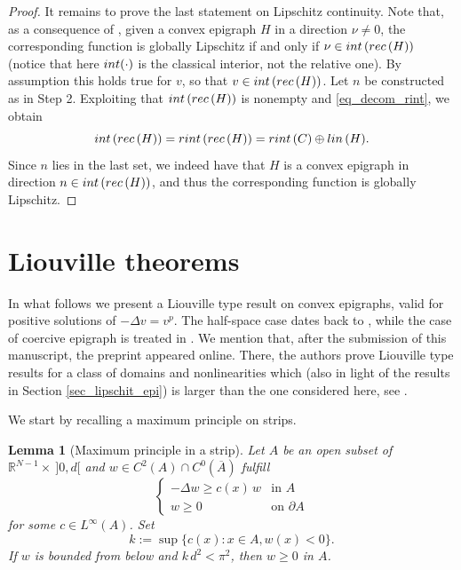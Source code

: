 \documentclass[12pt]{amsart}
\numberwithin{equation}{section}
\theoremstyle{plain}
\newtheorem{lemma}[theorem]{Lemma}
\theoremstyle{plain}
\theoremstyle{plain}
\theoremstyle{definition}
\newcommand{\R}{{\mathbb R}}
\renewcommand{\ge}{\geqslant}
\begin{document}
\begin{proof}
It remains to prove the last statement on Lipschitz continuity. 
Note that, as a consequence of \cite[Theorems 8.5 and 10.5]{Roc96}, given a convex epigraph $H$ in a direction $\nu\ne 0$, the corresponding function is globally Lipschitz if and only if $\nu\in {\rm int}\, ({\rm rec}\, (H))$ (notice that here ${\rm int}(\cdot)$ is the classical interior, not the relative one). 
By assumption this holds true for $v$, so that $v\in {\rm int}\, ({\rm rec}\, (H))$. Let $n$ be constructed as in Step 2. 
Exploiting that ${\rm int}\, ({\rm rec}\, (H))$ is nonempty and \eqref{eq_decom_rint}, we obtain 
 \[
 {\rm int}\, ({\rm rec}\, (H))={\rm rint}\, ({\rm rec}\, (H))={\rm rint}\, (C)\oplus {\rm lin}\, (H).
 \]
Since $n$ lies in the last set, we indeed have that $H$ is a convex epigraph in direction $n\in {\rm int}\, ({\rm rec}\, (H))$, and thus the corresponding function is globally Lipschitz. 
\end{proof}



\section{Liouville theorems}
\label{sec_liouville}

In what follows we present a Liouville type result on convex epigraphs, valid for positive solutions of $-\Delta v=v^p$.
The half-space case dates back to \cite{Dan92}, while the case of coercive epigraph is treated in \cite{EsLi82}. 
We mention that, after the submission of this manuscript, the preprint \cite{BFS26} appeared online. 
There, the authors prove Liouville type results for a class of domains and nonlinearities which (also in light of the results in Section \ref{sec_lipschit_epi}) is larger than the one considered here, see \cite[Theorem 5.2 and 5.3]{BFS26}.

We start by recalling a maximum principle on strips.

\begin{lemma}[Maximum principle in a strip]
\label{lem_max_strip}
Let $A$ be an open subset of $\R^{N-1}\times \ ]0, d[$ and $w\in C^2(A)\cap C^0(\overline{A})$ fulfill
\[
\begin{cases}
-\Delta w\ge c(x)\, w&\text{in $A$}\\
w\ge 0&\text{on $\partial A$}
\end{cases}
\]
for some $c\in L^\infty(A)$. Set 
\[
k:=\sup \big\{c(x): x\in A, w(x)<0\big\}.
\]
If $w$ is bounded from below and $k\, d^2<\pi^2$, then $w\ge 0$ in $A$.
\end{lemma}
\end{document}
